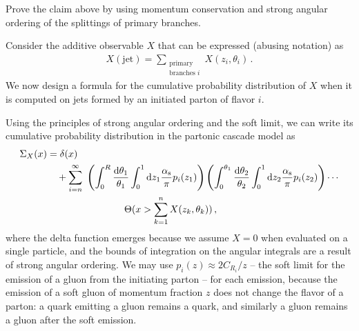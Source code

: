 \begin{exercise}
    Prove the claim above by using momentum conservation and strong angular ordering of the splittings of primary branches.
\end{exercise}



\begin{example}
    \label{ex:dyson-substructure}
    Consider the additive observable \(X\) that can be expressed (abusing notation) as
    \begin{align}
        X(\text{jet})
        =
        \sum_{\substack{\text{primary}\\\text{branches } i}}
        X(z_i, \theta_i)
        \,.
    \end{align}
    We now design a formula for the cumulative probability distribution of \(X\) when it is computed on jets formed by an initiated parton of flavor \(i\).

    Using the principles of strong angular ordering and the soft limit, we can write its cumulative probability distribution in the partonic cascade model as
    \begin{align}
        \label{eq:general-additive-cumulative-distribution}
        \Sigma_X(x)
        &=
        \delta(x)
        \\
        \notag
        &\quad
        +
        \sum_{i = n}^\infty
        \,\,
        \le(
        \int_0^R \frac{\dd\theta_1}{\theta_1}
        \int_0^1 \dd z_1
        \frac{\alphas}{\pi}
        p_i(z_1)
        \ri)
        \le(
        \int_0^{\theta_1} \frac{\dd\theta_2}{\theta_2}
        \int_0^1 \dd z_2
        \frac{\alphas}{\pi}
        p_i(z_2)
        \ri)
        \cdots
        \\
        &\qquad\qquad\qquad\qquad
        \Theta(x > \sum_{k = 1}^n X(z_k, \theta_k))
        \,,
    \end{align}
    where the delta function emerges because we assume \(X = 0\) when evaluated on a single particle, and the bounds of integration on the angular integrals are a result of strong angular ordering.
    We may use \(p_i(z) \approx 2 C_{R_i} / z\) -- the soft limit for the emission of a gluon from the initiating parton -- for each emission, because the emission of a soft gluon of momentum fraction \(z\) does not change the flavor of a parton:
    a quark emitting a gluon remains a quark, and similarly a gluon remains a gluon after the soft emission.


\end{example}
